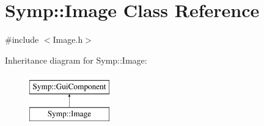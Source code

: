 \hypertarget{class_symp_1_1_image}{\section{Symp\-:\-:Image Class Reference}
\label{class_symp_1_1_image}
}


{\ttfamily \#include $<$Image.\-h$>$}

Inheritance diagram for Symp\-:\-:Image\-:\begin{figure}[H]
\begin{center}
\leavevmode
\includegraphics[height=2.000000cm]{class_symp_1_1_image}
\end{center}
\end{figure}

